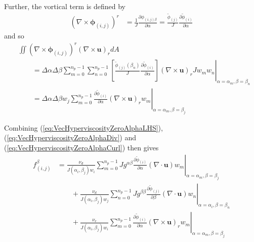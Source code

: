\documentclass{article}
\newcommand{\vb}{\mathbf}
\newcommand{\vg}{\boldsymbol}
\newcommand{\pdiff}[2]{\frac{\partial #1}{\partial #2}}
\begin{document}
Further, the vortical term is defined by
\begin{align}
(\nabla \times \vg{\phi}_{(i,j)})^r &= \frac{1}{J} \pdiff{\phi_{(i,j) \beta}}{\alpha} = \frac{\tilde{\phi}_{(j)}}{J} \pdiff{\tilde{\phi}_{(i)}}{\alpha}
\end{align} and so
\begin{align}
& \iint (\nabla \times \vg{\phi}_{(i,j)})^r (\nabla \times \vb{u})_r dA \nonumber \\
& \qquad = \Delta \alpha \Delta \beta \sum_{m=0}^{n_p-1} \sum_{n=0}^{n_p-1} \left. \left[\frac{\tilde{\phi}_{(j)}(\beta_n)}{J} \pdiff{\tilde{\phi}_{(i)}}{\alpha}\right] (\nabla \times \vb{u})_r J w_m w_n \right\vert_{\alpha = \alpha_m, \beta = \beta_n} \\
& \qquad = \Delta \alpha \Delta \beta w_j \sum_{m=0}^{n_p-1} \left. \pdiff{\tilde{\phi}_{(i)}}{\alpha} (\nabla \times \vb{u})_r w_m \right\vert_{\alpha = \alpha_m, \beta = \beta_j} \label{eq:VecHyperviscosityZeroAlphaCurl}
\end{align}

Combining (\ref{eq:VecHyperviscosityZeroAlphaLHS}), (\ref{eq:VecHyperviscosityZeroAlphaDiv}) and (\ref{eq:VecHyperviscosityZeroAlphaCurl}) then gives
\begin{align}
f^{\beta}_{(i,j)} &= \frac{\nu_d}{J(\alpha_i, \beta_j) w_i} \sum_{m=0}^{n_p-1} \left. J g^{\alpha \beta} \pdiff{\tilde{\phi}_{(i)}}{\alpha} (\nabla \cdot \vb{u}) w_m \right\vert_{\alpha = \alpha_m, \beta = \beta_j} \nonumber \\
& \qquad + \frac{\nu_d}{J(\alpha_i, \beta_j) w_j} \sum_{n=0}^{n_p-1} \left. J g^{\beta \beta} \pdiff{\tilde{\phi}_{(j)}}{\beta} (\nabla \cdot \vb{u}) w_n \right\vert_{\alpha = \alpha_i, \beta = \beta_n} \nonumber \\
& \qquad + \frac{\nu_v}{J(\alpha_i, \beta_j) w_i} \sum_{m=0}^{n_p-1} \left. \pdiff{\tilde{\phi}_{(i)}}{\alpha} (\nabla \times \vb{u})_r w_m \right\vert_{\alpha = \alpha_m, \beta = \beta_j}
\end{align}
\end{document}
